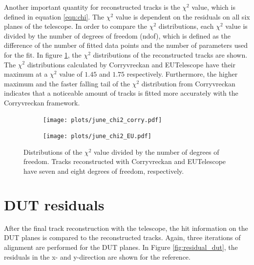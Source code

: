 Another important quantity for reconstructed tracks is the $\chi^2$ value, which is defined in equation \ref{eqn:chi}. The $\chi^2$ value is dependent on the
residuals on all six planes of the telescope. In order to compare the $\chi^2$ distributions, each $\chi^2$ value is divided by the number
of degrees of freedom (ndof), which is defined as the difference of the number of fitted data points and
the number of parameters used for the fit. In figure \ref{fig:ndof}, the $\chi^2$ distributions of the reconstructed tracks are shown. \\
The $\chi^2$ distributions calculated by Corryvreckan and EUTelescope have their maximum at
a $\chi^2$ value of $1.45$ and $1.75$ respectively. Furthermore, the higher maximum and the faster falling tail of the $\chi^2$ distribution from
Corryvreckan indicates that a noticeable amount of tracks is fitted more accurately with the Corryvreckan framework.

\begin{figure}
  \hspace{-0.4cm}
  \begin{subfigure}{0.51\textwidth}
      \texttt{[image: plots/june\_chi2\_corry.pdf]}
  \end{subfigure}
  \begin{subfigure}{0.51\textwidth}
      \hspace{-0.19cm}
      \texttt{[image: plots/june\_chi2\_EU.pdf]}
  \end{subfigure}
  \caption{Distributions of the $\chi^2$ value divided by the number of degrees of freedom. Tracks reconstructed with Corryvreckan and EUTelescope
   have seven and eight degrees of freedom, respectively.}
  \label{fig:ndof}
\end{figure}



\section{DUT residuals}
After the final track reconstruction with the telescope, the hit information on the DUT planes is compared to the
reconstructed tracks. Again, three iterations of alignment are performed for the DUT planes. In Figure \ref{fig:residual_dut}, the residuals in the
x- and y-direction are shown for the reference.

